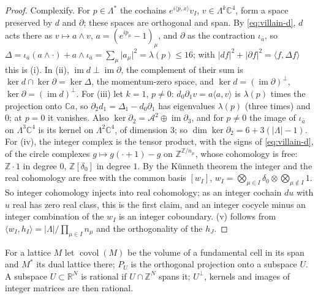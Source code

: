 \documentclass[11pt,a4paper]{amsart}
\theoremstyle{definition}
\theoremstyle{remark}
\numberwithin{equation}{section}
\newcommand{\R}{\mathbb{R}}          %
\newcommand{\C}{\mathbb{C}}          %
\newcommand{\Z}{\mathbb{Z}}          %
\newcommand{\ip}[2]{\langle #1,#2\rangle}  %
\newcommand{\abs}[1]{\lvert #1\rvert}      %
\begin{document}
\begin{proof}
Complexify. For $p\in\Lambda^*$ the cochains $e^{i\ip px}v_I$, $v\in\Lambda^k\C^4$, form a space preserved by $d$ and $\partial$; these spaces are orthogonal and span. By \eqref{eq:villain-d}, $d$ acts there as $v\mapsto a\wedge v$, $a=(e^{ip_\mu}-1)_\mu$, and $\partial$ as the contraction $\iota_{\bar a}$, so $\Delta=\iota_{\bar a}(a\wedge\cdot)+a\wedge\iota_{\bar a}=\sum_\mu\abs{a_\mu}^2=\lambda(p)\le16$; with $\abs{df}^2+\abs{\partial f}^2=\ip f{\Delta f}$ this is (i). In (ii), $\operatorname{im}d\perp\operatorname{im}\partial$, the complement of their sum is $\ker d\cap\ker\partial=\ker\Delta$, the momentum-zero space, and $\ker d=(\operatorname{im}\partial)^\perp$, $\ker\partial=(\operatorname{im}d)^\perp$. For (iii) let $k=1$, $p\ne0$: $d_0\partial_1v=a\ip av$ is $\lambda(p)$ times the projection onto $\C a$, so $\partial_2d_1=\Delta_1-d_0\partial_1$ has eigenvalues $\lambda(p)$ (three times) and $0$; at $p=0$ it vanishes. Also $\ker\partial_2=\mathcal A^2\oplus\operatorname{im}\partial_3$, and for $p\ne0$ the image of $\iota_{\bar a}$ on $\Lambda^3\C^4$ is its kernel on $\Lambda^2\C^4$, of dimension $3$; so $\dim\ker\partial_2=6+3(|\Lambda|-1)$. For (iv), the integer complex is the tensor product, with the signs of \eqref{eq:villain-d}, of the circle complexes $g\mapsto g(\cdot+1)-g$ on $\Z^{\Z/n_\mu}$, whose cohomology is free: $\Z\cdot1$ in degree $0$, $\Z[\delta_0]$ in degree $1$. By the K\"unneth theorem the integer and the real cohomology are free with the common basis $[w_I]$, $w_I=\bigotimes_{\mu\in I}\delta_0\otimes\bigotimes_{\mu\notin I}1$. So integer cohomology injects into real cohomology; as an integer cochain $du$ with $u$ real has zero real class, this is the first claim, and an integer cocycle minus an integer combination of the $w_I$ is an integer coboundary. (v) follows from $\ip{w_I}{h_I}=|\Lambda|/\prod_{\mu\in I}n_\mu$ and the orthogonality of the $h_J$.
\end{proof}

For a lattice $M$ let $\operatorname{covol}(M)$ be the volume of a fundamental cell in its span and $M^*$ its dual lattice there; $P_U$ is the orthogonal projection onto a subspace $U$. A subspace $U\subset\R^N$ is rational if $U\cap\Z^N$ spans it; $U^\perp$, kernels and images of integer matrices are then rational.
\end{document}
